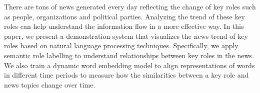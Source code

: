 There are tons of news generated every day reflecting the change of key roles such as people, organizations and political parties. Analyzing the trend of these key roles can help understand the information flow in a more effective way. In this paper, we present a demonstration system that visualizes the news trend of key roles based on natural language processing techniques. Specifically, we apply semantic role labelling to understand relationships between key roles in the news. We also train a dynamic word embedding model to align representations of words in different time periods to measure how the similarities between a key role and news topics change over time.
